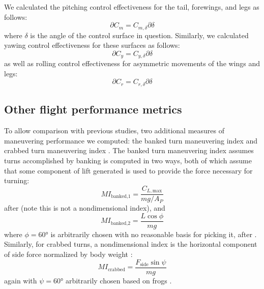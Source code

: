 We calculated the pitching control effectiveness for the tail, forewings, and legs as follows:
\begin{equation}
\partial C_m = C_{m,\delta} \partial\delta
\end{equation}
where $\delta$ is the angle of the control surface in question.  Similarly, we calculated yawing control effectiveness for these surfaces as follows:
\begin{equation}
\partial C_y = C_{y,\delta} \partial\delta
\end{equation}
as well as rolling control effectiveness for asymmetric movements of the wings and legs:
\begin{equation}
\partial C_r = C_{r,\delta} \partial\delta
\end{equation}

\subsection{Other flight performance metrics}
To allow comparison with previous studies, two additional measures of maneuvering performance we computed: the banked turn maneuvering index and crabbed turn maneuvering index \citep{Emerson:1990b, McCay:2001, McCay:2001a}.  The banked turn maneuvering index assumes turns accomplished by banking is computed in two ways, both of which assume that some component of lift generated is used to provide the force necessary for turning:
\begin{equation}
MI_{\mbox{banked,1}} = \frac{C_{L,\mbox{max}}}{mg/A_P}
\end{equation}
after \citep{Emerson:1990b} (note this is not a nondimensional index), and 
\begin{equation}
MI_{\mbox{banked,2}} = \frac{L \cos{\phi}}{mg}
\end{equation}
where $\phi=\ang{60}$ is arbitrarily chosen with no reasonable basis for picking it, after \citep{McCay:2001, McCay:2001a}.  Similarly, for crabbed turns, a nondimensional index is the horizontal component of side force normalized by body weight \citep{McCay:2001, McCay:2001a}:
\begin{equation}
MI_{\mbox{crabbed}} = \frac{F_{\mbox{side}} \sin{\psi}}{mg}
\end{equation}
again with $\psi=\ang{60}$ arbitrarily chosen based on frogs \citep{McCay:2001,McCay:2001a}. 

